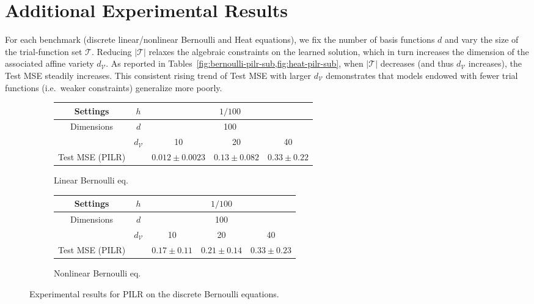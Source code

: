 \documentclass{article}
\theoremstyle{plain}
\theoremstyle{definition}
\theoremstyle{remark}
\begin{document}
\section{Additional Experimental Results}
\label{app:additional_exp}
For each benchmark (discrete linear/nonlinear Bernoulli and Heat equations), we fix the number of basis functions \(d\) and vary the size of the trial‐function set \(\mathcal{T}\).  Reducing \(|\mathcal{T}|\) relaxes the algebraic constraints on the learned solution, which in turn increases the dimension of the associated affine variety \(d_{\mathcal{V}}\). As reported in Tables~\cref{fig:bernoulli-pilr-sub,fig:heat-pilr-sub}, when \(|\mathcal{T}|\) decreases (and thus \(d_{\mathcal{V}}\) increases), the Test MSE steadily increases.  This consistent rising trend of Test MSE with larger \(d_{\mathcal{V}}\) demonstrates that models endowed with fewer trial functions (i.e.\ weaker constraints) generalize more poorly.
\begin{figure}[!htb]
  \centering
  \captionsetup[subfigure]{justification=centering}
  \begin{subfigure}[t]{\textwidth}
    \centering
    \caption{Linear Bernoulli eq.}
    \begin{tabular}{cc|ccc}
      \toprule
      Settings & $h$ & \multicolumn{3}{c}{$1/100$} \\
      \midrule
      \multirow{2}{*}{Dimensions}  & $d$                & \multicolumn{3}{c}{100}       \\
                                   & $d_{\mathcal{V}}$  & 10 & 20 & 40 \\
      \midrule
      Test MSE (PILR)             &                    & $0.012 \pm 0.0023$ & $0.13 \pm 0.082$ & $0.33 \pm 0.22$ \\
      \bottomrule
    \end{tabular}
  \end{subfigure}

  \vspace{1em}

  \begin{subfigure}[t]{\textwidth}
    \centering
    \caption{Nonlinear Bernoulli eq.}
    \begin{tabular}{cc|ccc}
      \toprule
      Settings & $h$ & \multicolumn{3}{c}{$1/100$} \\
      \midrule
      \multirow{2}{*}{Dimensions}  & $d$                & \multicolumn{3}{c}{100}       \\
                                   & $d_{\mathcal{V}}$  & 10 & 20 & 40 \\
      \midrule
      Test MSE (PILR)             &                    & $0.17 \pm 0.11$ & $0.21 \pm 0.14$ & $0.33 \pm 0.23$ \\
      \bottomrule
    \end{tabular}
  \end{subfigure}

  \caption{Experimental results for PILR on the discrete Bernoulli equations.}
  \label{fig:bernoulli-pilr-sub}
\end{figure}
\end{document}
